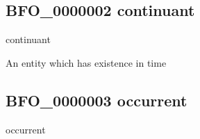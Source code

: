 \documentclass[letterpaper,10pt,english]{sphinxmanual}
\begin{document}
\subsection{BFO\_0000002 \sphinxhyphen{} continuant}
\label{\detokenize{doc-BFO_0000002:bfo-0000002-continuant}}\label{\detokenize{doc-BFO_0000002:index-0}}\label{\detokenize{doc-BFO_0000002::doc}}
\begin{sphinxShadowBox}

\sphinxAtStartPar
continuant
\end{sphinxShadowBox}

\begin{sphinxShadowBox}

\sphinxAtStartPar
{\hyperref[\detokenize{doc-BFO_0000001::doc}]{}}
\end{sphinxShadowBox}

\begin{sphinxShadowBox}

\sphinxAtStartPar
An entity which has existence in time
\end{sphinxShadowBox}

\begin{sphinxShadowBox}

\sphinxAtStartPar
{}
\end{sphinxShadowBox}
\begin{quote}

\ignorespaces \end{quote}


\subsection{BFO\_0000003 \sphinxhyphen{} occurrent}
\label{\detokenize{doc-BFO_0000003:bfo-0000003-occurrent}}\label{\detokenize{doc-BFO_0000003:index-0}}\label{\detokenize{doc-BFO_0000003::doc}}
\begin{sphinxShadowBox}

\sphinxAtStartPar
occurrent
\end{sphinxShadowBox}

\begin{sphinxShadowBox}

\sphinxAtStartPar
{\hyperref[\detokenize{doc-BFO_0000001::doc}]{}}
\end{sphinxShadowBox}
\end{document}
